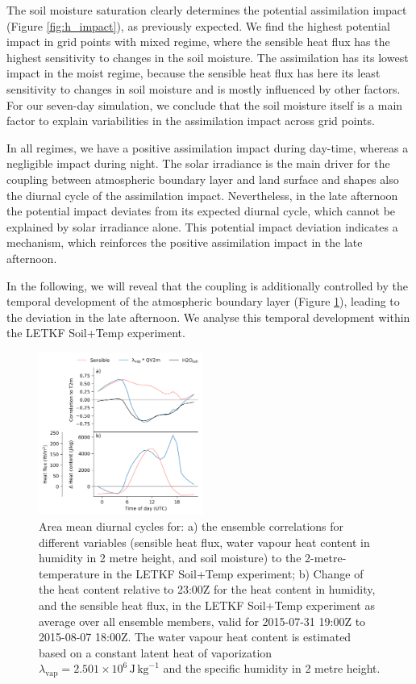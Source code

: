 \documentclass[HESSD, manuscript]{copernicus}
\begin{document}
The soil moisture saturation clearly determines the potential assimilation impact (Figure \ref{fig:h_impact}), as previously expected.
We find the highest potential impact in grid points with mixed regime, where the sensible heat flux has the highest sensitivity to changes in the soil moisture.
The assimilation has its lowest impact in the moist regime, because the sensible heat flux has here its least sensitivity to changes in soil moisture and is mostly influenced by other factors.
For our seven-day simulation, we conclude that the soil moisture itself is a main factor to explain variabilities in the assimilation impact across grid points.

In all regimes, we have a positive assimilation impact during day-time, whereas a negligible impact during night.
The solar irradiance is the main driver for the coupling between atmospheric boundary layer and land surface and shapes also the diurnal cycle of the assimilation impact.
Nevertheless, in the late afternoon the potential impact deviates from its expected diurnal cycle, which cannot be explained by solar irradiance alone.
This potential impact deviation indicates a mechanism, which reinforces the positive assimilation impact in the late afternoon.

In the following, we will reveal that the coupling is additionally controlled by the temporal development of the atmospheric boundary layer (Figure \ref{fig:cycle_corr}), leading to the deviation in the late afternoon.
We analyse this temporal development within the LETKF Soil+Temp experiment.

\begin{figure}[ht]
	\includegraphics[width=0.48\textwidth]{figures/fig_10_cycle_corr.png}
	\caption{
		Area mean diurnal cycles for: a) the ensemble correlations for different variables (sensible heat flux, water vapour heat content in humidity in 2 metre height, and soil moisture) to the 2-metre-temperature in the LETKF Soil+Temp experiment; b) Change of the heat content relative to 23:00Z for the heat content in humidity, and the sensible heat flux, in the LETKF Soil+Temp experiment as average over all ensemble members, valid for 2015-07-31 19:00Z to 2015-08-07 18:00Z. The water vapour heat content is estimated based on a constant latent heat of vaporization $\lambda_{\text{vap}} = 2.501 \times 10^6\, \text{J}\, \text{kg}^{-1}$ and the specific humidity in 2 metre height.
	}
	\label{fig:cycle_corr}
\end{figure}
\end{document}
